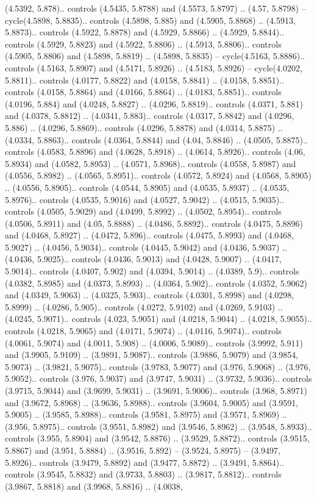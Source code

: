 (4.5392, 5.878).. controls (4.5435, 5.8788) and (4.5573, 5.8797) .. (4.57, 5.8798) -- cycle(4.5898, 5.8835).. controls (4.5898, 5.885) and (4.5905, 5.8868) .. (4.5913, 5.8873).. controls (4.5922, 5.8878) and (4.5929, 5.8866) .. (4.5929, 5.8844).. controls (4.5929, 5.8823) and (4.5922, 5.8806) .. (4.5913, 5.8806).. controls (4.5905, 5.8806) and (4.5898, 5.8819) .. (4.5898, 5.8835) -- cycle(4.5163, 5.8886).. controls (4.5163, 5.8907) and (4.5171, 5.8926) .. (4.5183, 5.8926) -- cycle(4.0202, 5.8811).. controls (4.0177, 5.8822) and (4.0158, 5.8841) .. (4.0158, 5.8851).. controls (4.0158, 5.8864) and (4.0166, 5.8864) .. (4.0183, 5.8851).. controls (4.0196, 5.884) and (4.0248, 5.8827) .. (4.0296, 5.8819).. controls (4.0371, 5.881) and (4.0378, 5.8812) .. (4.0341, 5.883).. controls (4.0317, 5.8842) and (4.0296, 5.886) .. (4.0296, 5.8869).. controls (4.0296, 5.8878) and (4.0314, 5.8875) .. (4.0334, 5.8863).. controls (4.0364, 5.8844) and (4.04, 5.8846) .. (4.0505, 5.8875).. controls (4.0583, 5.8896) and (4.0628, 5.8918) .. (4.0614, 5.8926).. controls (4.06, 5.8934) and (4.0582, 5.8953) .. (4.0571, 5.8968).. controls (4.0558, 5.8987) and (4.0556, 5.8982) .. (4.0565, 5.8951).. controls (4.0572, 5.8924) and (4.0568, 5.8905) .. (4.0556, 5.8905).. controls (4.0544, 5.8905) and (4.0535, 5.8937) .. (4.0535, 5.8976).. controls (4.0535, 5.9016) and (4.0527, 5.9042) .. (4.0515, 5.9035).. controls (4.0505, 5.9029) and (4.0499, 5.8992) .. (4.0502, 5.8954).. controls (4.0506, 5.8911) and (4.05, 5.8888) .. (4.0486, 5.8892).. controls (4.0475, 5.8896) and (4.0468, 5.8927) .. (4.0472, 5.896).. controls (4.0475, 5.8993) and (4.0468, 5.9027) .. (4.0456, 5.9034).. controls (4.0445, 5.9042) and (4.0436, 5.9037) .. (4.0436, 5.9025).. controls (4.0436, 5.9013) and (4.0428, 5.9007) .. (4.0417, 5.9014).. controls (4.0407, 5.902) and (4.0394, 5.9014) .. (4.0389, 5.9).. controls (4.0382, 5.8985) and (4.0373, 5.8993) .. (4.0364, 5.902).. controls (4.0352, 5.9062) and (4.0349, 5.9063) .. (4.0325, 5.903).. controls (4.0301, 5.8998) and (4.0298, 5.8999) .. (4.0286, 5.905).. controls (4.0272, 5.9102) and (4.0269, 5.9103) .. (4.0245, 5.9071).. controls (4.023, 5.9051) and (4.0218, 5.9044) .. (4.0218, 5.9055).. controls (4.0218, 5.9065) and (4.0171, 5.9074) .. (4.0116, 5.9074).. controls (4.0061, 5.9074) and (4.0011, 5.908) .. (4.0006, 5.9089).. controls (3.9992, 5.911) and (3.9905, 5.9109) .. (3.9891, 5.9087).. controls (3.9886, 5.9079) and (3.9854, 5.9073) .. (3.9821, 5.9075).. controls (3.9783, 5.9077) and (3.976, 5.9068) .. (3.976, 5.9052).. controls (3.976, 5.9037) and (3.9747, 5.9031) .. (3.9732, 5.9036).. controls (3.9715, 5.9044) and (3.9699, 5.9031) .. (3.9691, 5.9006).. controls (3.968, 5.8971) and (3.9672, 5.8968) .. (3.9636, 5.8988).. controls (3.9604, 5.9005) and (3.9591, 5.9005) .. (3.9585, 5.8988).. controls (3.9581, 5.8975) and (3.9571, 5.8969) .. (3.956, 5.8975).. controls (3.9551, 5.8982) and (3.9546, 5.8962) .. (3.9548, 5.8933).. controls (3.955, 5.8904) and (3.9542, 5.8876) .. (3.9529, 5.8872).. controls (3.9515, 5.8867) and (3.951, 5.8884) .. (3.9516, 5.892) -- (3.9524, 5.8975) -- (3.9497, 5.8926).. controls (3.9479, 5.8892) and (3.9477, 5.8872) .. (3.9491, 5.8864).. controls (3.9545, 5.8832) and (3.9733, 5.8803) .. (3.9817, 5.8812).. controls (3.9867, 5.8818) and (3.9968, 5.8816) .. (4.0038, 
